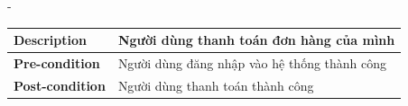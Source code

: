 \begin {list} {-}{}
\begin{itemize}
\begin{table}[h]
\begin{tabular}{|l|l|}
                \textbf{Description}      & Người dùng thanh toán đơn hàng của mình                                                                                                                                                                                                                                                                                                                                                                                                                                                                                                                                                                                                                                                                                                                                                                                                    \\ \hline
                \textbf{Pre-condition}    & Người dùng đăng nhập vào hệ thống thành công                                                                                                                                                                                                                                                                                                                                                                                                                                                                                                                                                                                                                                                                                                                                                                                               \\ \hline
                \textbf{Post-condition}   & Người dùng thanh toán thành công                                                                                                                                                                                                                                                                                                                                                                                                                                                                                                                                                                                                                                                                                                                                                                                                           \\ \hline

\end{tabular}
\end{table}
\end{itemize}
\end{list}

